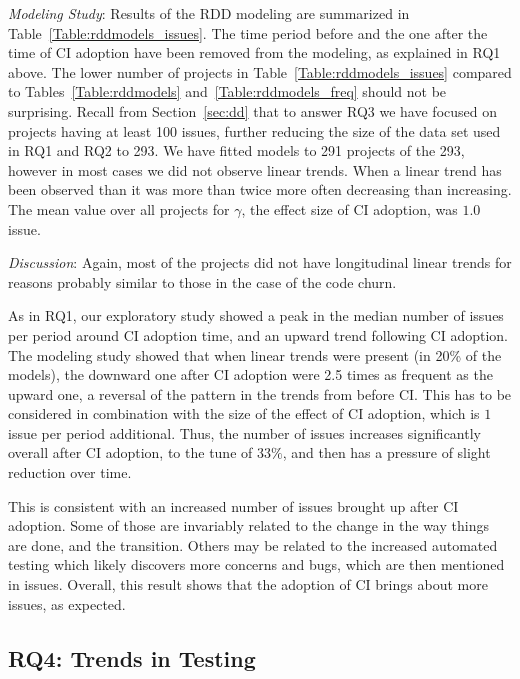 

\smallskip\noindent \emph{Modeling Study}:
Results of the RDD modeling are summarized in Table~\ref{Table:rddmodels_issues}.
The time period before and the one after the time of CI adoption have been removed from the modeling, as explained in RQ1 above.
The lower number of projects in Table~\ref{Table:rddmodels_issues} 
compared to Tables~\ref{Table:rddmodels} and~\ref{Table:rddmodels_freq} 
should not be surprising. 
Recall from Section~\ref{sec:dd} that to answer RQ3 we have focused on 
projects having at least 100 issues, further reducing the size of the data set 
used in RQ1 and RQ2 to 293.
We have fitted models to 291 projects of the 293, however in most cases we 
did not observe linear trends.
When a linear trend has been observed than it was more than twice more 
often decreasing than increasing.
The mean value over all projects for $\gamma$, the effect size of CI adoption, 
was $1.0$ issue.


\smallskip\noindent \emph{Discussion}:
Again, most of the projects did not have longitudinal linear trends for reasons probably similar to those in the case of the code churn.

As in RQ1, our exploratory study showed a peak in the median number of issues per period around CI adoption time, and an upward trend following CI adoption.
The modeling study showed that when linear trends were present (in 20\% 
of the models), the downward one after CI adoption were 2.5 times as frequent 
as the upward one, a reversal of the pattern in the trends from before CI.
This has to be considered in combination with the size of the effect of CI adoption, which is $1$ issue per period additional.
Thus, the number of issues increases significantly overall after CI adoption, to the tune of $33\%$, and then has a pressure of slight reduction over time.

This is consistent with an increased number of issues brought up after CI adoption. Some of those are invariably related to the change in the way things are done, and the transition. Others may be related to the increased automated testing which likely discovers more concerns and bugs, which are then mentioned in issues.
Overall, this result shows that the adoption of CI brings about more issues, as expected.




\subsection{RQ4: Trends in Testing}

